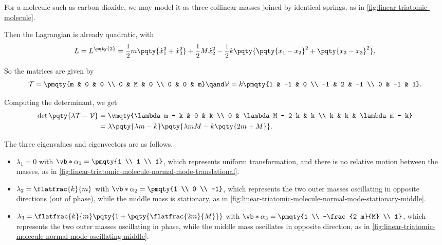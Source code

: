 \begin{example}
    For a molecule such as carbon dioxide, we may model it as three collinear masses joined by identical springs, as in \autoref{fig:linear-triatomic-molecule}.

    Then the Lagrangian is already quadratic, with
    \begin{equation}
        L = L^{\pqty{2}} = \frac{1}{2} m \pqty{\dot{x}_1^2 + \dot{x}_3^2} + \frac{1}{2} M \dot{x}_2^2 - \frac{1}{2} k \pqty{\pqty{x_1 - x_2}^2 + \pqty{x_2 - x_3}^2}.
    \end{equation}

    So the matrices are given by
    \begin{equation}
        \mathcal{T} = \pmqty{m & 0 & 0 \\ 0 & M & 0 \\ 0 & 0 & m} \qand \mathcal{V} = k \pmqty{1 & -1 & 0 \\ -1 & 2 & -1 \\ 0 & -1 & 1}.
    \end{equation}

    Computing the determinant, we get
    \begin{subequations}
        \begin{align}
            \det\pqty{\lambda \mathcal{T} - \mathcal{V}} &= \vmqty{\lambda m - k & 0 & k \\ 0 & \lambda M - 2 k & k \\ k & k & \lambda m - k} \\
            &= \lambda \pqty{\lambda m - k} \pqty{\lambda m M - k \pqty{2m + M}}.
        \end{align}
    \end{subequations}

    The three eigenvalues and eigenvectors are as follows.

    \begin{itemize}
        \item \(\lambda_1 = 0\) with \(\vb*{\alpha}_1 = \pmqty{1 \\ 1 \\ 1}\), which represents uniform transformation, and there is no relative motion between the masses, as in \autoref{fig:linear-triatomic-molecule-normal-mode-translational}.
        \item \(\lambda_2 = \flatfrac{k}{m}\) with \(\vb*{\alpha}_2 = \pmqty{1 \\ 0 \\ -1}\), which represents the two outer masses oscillating in opposite directions (out of phase), while the middle mass is stationary, as in \autoref{fig:linear-triatomic-molecule-normal-mode-stationary-middle}.
        \item \(\lambda_3 = \flatfrac{k}{m} \pqty{1 + \pqty{\flatfrac{2 m}{M}}}\) with \(\vb*{\alpha}_3 = \pmqty{1 \\ -\frac{2 m}{M} \\ 1}\), which represents the two outer masses oscillating in phase, while the middle mass oscillates in opposite direction, as in \autoref{fig:linear-triatomic-molecule-normal-mode-oscillating-middle}.
    \end{itemize}
\end{example}

